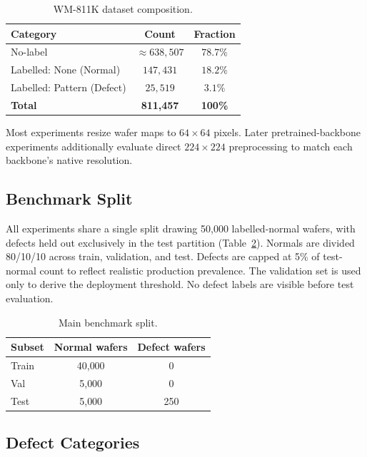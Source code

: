 \documentclass[11pt]{article}
\begin{document}
\begin{table}[H]
\centering
\caption{WM-811K dataset composition.}
\label{tab:dataset_distribution}
\begin{tabular}{lcc}
\toprule
Category & Count & Fraction \\
\midrule
No-label & ${\approx}638{,}507$ & $78.7\%$ \\
Labelled: None (Normal) & $147{,}431$ & $18.2\%$ \\
Labelled: Pattern (Defect) & $25{,}519$ & $3.1\%$ \\
\midrule
\textbf{Total} & \textbf{811,457} & \textbf{100\%} \\
\bottomrule
\end{tabular}
\end{table}

Most experiments resize wafer maps to $64\!\times\!64$ pixels. Later
pretrained-backbone experiments additionally evaluate direct $224\!\times\!224$
preprocessing to match each backbone's native resolution.

\subsection{Benchmark Split}

All experiments share a single split drawing 50,000 labelled-normal wafers,
with defects held out exclusively in the test partition (Table~\ref{tab:main_split}).
Normals are divided 80/10/10 across train, validation, and test.
Defects are capped at 5\% of test-normal count to reflect realistic production
prevalence. The validation set is used only to derive the deployment threshold. No defect labels are visible before test evaluation.

\begin{table}[H]
\centering
\caption{Main benchmark split.}
\label{tab:main_split}
\begin{tabular}{lcc}
\toprule
Subset & Normal wafers & Defect wafers \\
\midrule
Train   & 40{,}000 & 0   \\
Val     & 5{,}000  & 0   \\
Test    & 5{,}000  & 250 \\
\bottomrule
\end{tabular}
\end{table}

\subsection{Defect Categories}
\end{document}
